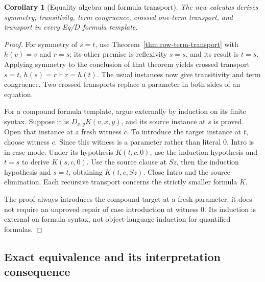 \documentclass[11pt,letterpaper]{article}
\newtheorem{corollary}[theorem]{Corollary}
\theoremstyle{definition}\newtheorem{definition}[theorem]{Definition}
\theoremstyle{remark}\newtheorem{remark}[theorem]{Remark}
\begin{document}
\begin{corollary}[Equality algebra and formula transport]
\label{cor:row-formula-transport}
The new calculus derives symmetry, transitivity, term congruence,
crossed one-term transport, and transport in every Eq/$D$ formula template.
\end{corollary}
\begin{proof}
For symmetry of $s=t$, use
Theorem~\ref{thm:row-term-transport} with $h(v)=v$ and $r=s$; its other
premise is reflexivity $s=s$, and its result is $t=s$.  Applying symmetry
to the conclusion of that theorem yields crossed transport
$s=t,\,h(s)=r\vdash r=h(t)$.  The usual instances now give transitivity
and term congruence.  Two crossed transports replace a parameter in
both sides of an equation.

For a compound formula template, argue externally by induction on its
finite syntax.  Suppose it is $D_{x,y}K(v,x,y)$, and its source instance
at $s$ is proved.  Open that instance at a fresh witness $c$.  To introduce
the target instance at $t$, choose witness $c$.  Since this witness is a
parameter rather than literal $0$, Intro is in case mode.  Under its
hypothesis $K(t,c,0)$, use the induction hypothesis and $t=s$ to derive
$K(s,c,0)$.  Use the source clause at $Sz$, then the induction hypothesis
and $s=t$, obtaining $K(t,c,Sz)$.  Close Intro and the source elimination.
Each recursive transport concerns the strictly smaller formula $K$.

The proof always introduces the compound target at a fresh parameter;
it does not require an unproved repair of case introduction at witness
$0$.  Its induction is external on formula syntax, not object-language
induction for quantified formulas.
\end{proof}

\subsection{Exact equivalence and its interpretation consequence}
\end{document}
